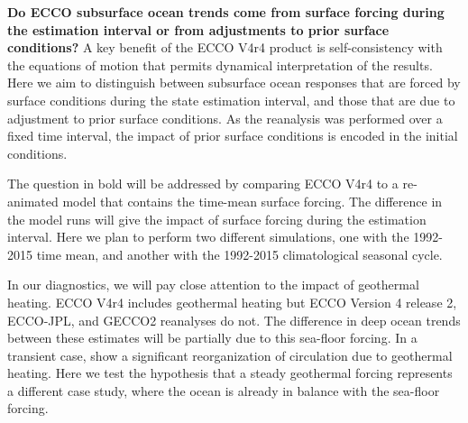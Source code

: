 \documentclass[authoryear,round,12pt]{article}
\begin{document}
{\bf Do ECCO subsurface ocean trends come from surface forcing during the estimation interval or from adjustments to prior surface conditions?} 
A key benefit of the ECCO V4r4 product is self-consistency with the equations of motion that permits  dynamical interpretation of the results. Here we aim to distinguish between subsurface ocean responses that are forced by surface conditions during the state estimation interval, and those that are due to adjustment to prior surface conditions. As the reanalysis was performed over a fixed time interval, the impact of prior surface conditions is encoded in the initial conditions. 


The question in bold will be addressed by comparing ECCO V4r4 to a re-animated model that contains the time-mean surface forcing. The difference in the model runs will give the impact of surface forcing during the estimation interval. Here we plan to perform two different simulations, one with the 1992-2015 time mean, and another with the 1992-2015 climatological seasonal cycle.

In our diagnostics, we will pay close attention to the impact of geothermal heating. ECCO V4r4 includes geothermal heating but ECCO Version 4 release 2, ECCO-JPL, and GECCO2 reanalyses do not. The difference in deep ocean trends between these estimates will be partially due to this sea-floor forcing. In a transient case, \citet{Piecuch-Heimbach-2015:Sensitivity} show a significant reorganization of circulation due to geothermal heating. Here we test the hypothesis that a steady geothermal forcing represents a different case study, where the ocean is already in balance with the sea-floor forcing. 

\end{document}

